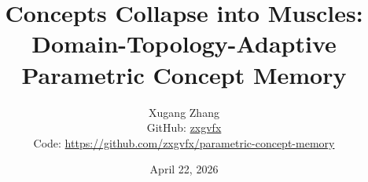 \documentclass[11pt,letterpaper]{article}
\title{%
  \textbf{Concepts Collapse into Muscles:} \\[2pt]
  \large Domain-Topology-Adaptive Parametric Concept Memory
}
\author{%
  Xugang Zhang \\
  \small GitHub: \href{https://github.com/zxgvfx}{zxgvfx} \\
  \small Code: \url{https://github.com/zxgvfx/parametric-concept-memory}
}
\date{April 22, 2026}
\begin{document}
\maketitle

\begin{abstract}

\end{abstract}




\end{document}
